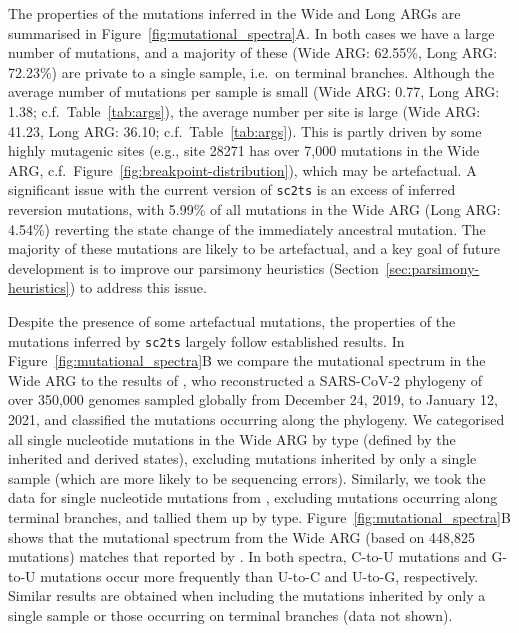 \documentclass{article}
\begin{document}
The properties of the mutations inferred in the Wide and Long
ARGs are summarised in Figure~\ref{fig:mutational_spectra}A. In both
cases we have a large number of mutations, and a majority of these
(Wide ARG: 62.55\%, Long ARG: 72.23\%) are private to a single
sample, i.e.\ on terminal branches.
Although the average number
of mutations per sample is small
(Wide ARG: 0.77, Long ARG: 1.38; c.f.\ Table~\ref{tab:args}), the average number per site
is large (Wide ARG: 41.23, Long ARG: 36.10; c.f.\ Table~\ref{tab:args}). This is
partly driven by some highly mutagenic sites (e.g., site 28271 has over 7,000
mutations in the Wide ARG, c.f.\ Figure~\ref{fig:breakpoint-distribution}), which
may be artefactual.
A significant issue with the current version of \texttt{sc2ts} is an excess
of inferred reversion mutations, with 5.99\% of all mutations in the Wide
ARG (Long ARG: 4.54\%) reverting the state change of the immediately
ancestral mutation. The majority of these mutations are likely to be
artefactual, and a key goal of future development is to improve
our parsimony heuristics (Section~\ref{sec:parsimony-heuristics}) to
address this issue.

Despite the presence of some artefactual mutations,
the properties of the mutations inferred by \texttt{sc2ts} largely follow
established results.
In Figure~\ref{fig:mutational_spectra}B we compare the mutational spectrum
in the Wide ARG to the results of \cite{Yi2021-sc},
who reconstructed a SARS-CoV-2 phylogeny of
over 350,000 genomes sampled globally from December 24, 2019, to January 12,
2021, and classified the mutations occurring along the phylogeny.
We categorised all single nucleotide
mutations in the Wide ARG by type (defined by the inherited and derived states),
excluding mutations inherited by only a single sample (which are
more likely to be sequencing errors).
Similarly, we took the data for single nucleotide mutations from
\citet[][\url{https://github.com/ju-lab/SC2_evol_signature}]{Yi2021-sc}, excluding
mutations occurring along terminal branches, and tallied them up by type.
Figure~\ref{fig:mutational_spectra}B shows that the mutational spectrum from the
Wide ARG (based on 448,825 mutations) matches that reported by \citet[based on
92,344 mutations]{Yi2021-sc}. In both spectra, C-to-U mutations and G-to-U
mutations occur more frequently than U-to-C and U-to-G, respectively. Similar
results are obtained when including the mutations inherited by only a single
sample or those occurring on terminal branches (data not shown).
\end{document}
